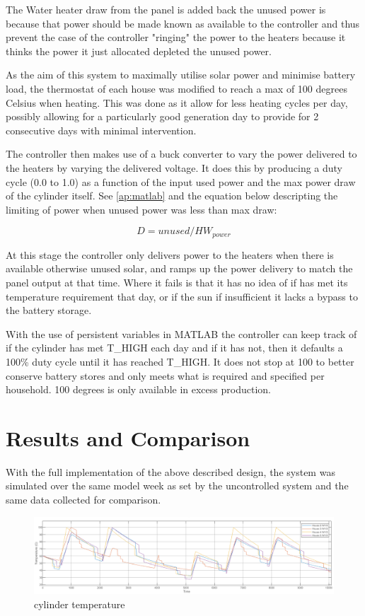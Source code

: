 \documentclass[11pt]{article}
\begin{document}
    The Water heater draw from the panel is added back the unused power is because that power should be made known as available to the controller and thus prevent the case of the controller "ringing" the power to the heaters because it thinks the power it just allocated depleted the unused power.
    
    As the aim of this system to maximally utilise solar power and minimise battery load, the thermostat of each house was modified to reach a max of 100 degrees Celsius when heating. This was done as it allow for less heating cycles per day, possibly allowing for a particularly good generation day to provide for 2 consecutive days with minimal intervention.

    The controller then makes use of a buck converter to vary the power delivered to the heaters by varying the delivered voltage. It does this by producing a duty cycle (0.0 to 1.0) as a function of the input used power and the max power draw of the cylinder itself. See \ref{ap:matlab} and the equation below descripting the limiting of power when unused power was less than max draw:
    
    $$D = unused/HW_{power}$$

    At this stage the controller only delivers power to the heaters when there is available otherwise unused solar, and ramps up the power delivery to match the panel output at that time. Where it fails is that it has no idea of if has met its temperature requirement that day, or if the sun if insufficient it lacks a bypass to the battery storage.

    With the use of persistent variables in MATLAB the controller can keep track of if the cylinder has met T\_HIGH each day and if it has not, then it defaults a 100\% duty cycle until it has reached T\_HIGH. It does not stop at 100 to better conserve battery stores and only meets what is required and specified per household. 100 degrees is only available in excess production. 

\newpage
\section{Results and Comparison}
    With the full implementation of the above described design, the system was simulated over the same model week as set by the uncontrolled system and the same data collected for comparison.

\begin{figure}[h!]
    \centering
    \includegraphics[width=\textwidth]{inc/controlled_temps.png}
    \caption{cylinder temperature}
    \label{fig:con_temps}
\end{figure}
\end{document}
